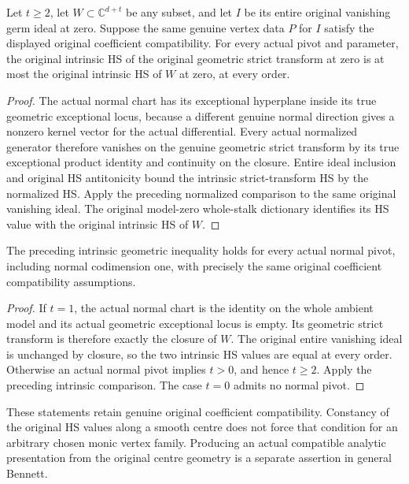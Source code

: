 \begin{theorem}
\label{hir:actual-coefficient-centre-geometric-bennett-at-least-two}
\leanok
Let $t\ge2$, let $W\subset\mathbb C^{d+t}$ be any subset, and let
$I$ be its entire original vanishing germ ideal at zero. Suppose the
same genuine vertex data $P$ for $I$ satisfy the displayed original
coefficient compatibility. For every actual pivot and parameter, the
original intrinsic HS of the original geometric strict transform at
zero is at most the original intrinsic HS of $W$ at zero, at every order.
\end{theorem}
\begin{proof}
The actual normal chart has its exceptional hyperplane inside its true
geometric exceptional locus, because a different genuine normal
direction gives a nonzero kernel vector for the actual differential.
Every actual normalized generator therefore vanishes on the genuine
geometric strict transform by its true exceptional product identity
and continuity on the closure. Entire ideal inclusion and original HS
antitonicity bound the intrinsic strict-transform HS by the normalized
HS. Apply the preceding normalized comparison to the same original
vanishing ideal. The original model-zero whole-stalk dictionary
identifies its HS value with the original intrinsic HS of $W$.
\end{proof}

\begin{theorem}
\label{hir:actual-coefficient-centre-geometric-bennett-all-normal-codimensions}
\leanok
The preceding intrinsic geometric inequality holds for every actual
normal pivot, including normal codimension one, with precisely the
same original coefficient compatibility assumptions.
\end{theorem}
\begin{proof}
If $t=1$, the actual normal chart is the identity on the whole ambient
model and its actual geometric exceptional locus is empty. Its
geometric strict transform is therefore exactly the closure of $W$.
The original entire vanishing ideal is unchanged by closure, so the
two intrinsic HS values are equal at every order. Otherwise an actual
normal pivot implies $t>0$, and hence $t\ge2$. Apply the preceding
intrinsic comparison. The case $t=0$ admits no normal pivot.
\end{proof}

These statements retain genuine original coefficient compatibility.
Constancy of the original HS values along a smooth centre does not
force that condition for an arbitrary chosen monic vertex family.
Producing an actual compatible analytic presentation from the original
centre geometry is a separate assertion in general Bennett.
